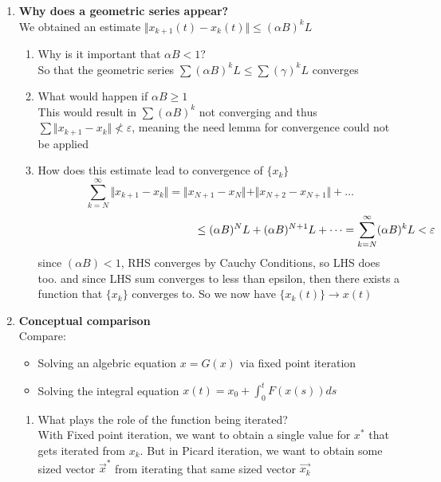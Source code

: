 \documentclass[12pt]{article}
\begin{document}
\begin{enumerate}
    \item[d)] \textbf{Why does a geometric series appear?} \\
    We obtained an estimate $\Vert x_{k+1}(t) - x_k(t) \Vert \leq (\alpha B)^k L$
    \begin{enumerate}
        \item Why is it important that $\alpha B < 1$? \\
        So that the geometric series $\sum (\alpha B)^k L \leq \sum (\gamma)^k L$ converges

        \item What would happen if $\alpha B \geq 1$ \\
        This would result in $\sum (\alpha B)^k$ not converging and thus $\sum \Vert x_{k+1} - x_k \Vert \nless \varepsilon$, meaning the need lemma for convergence could not be applied
        \vspace{4cm}
        \item How does this estimate lead to convergence of $\{x_k\}$ 
        \[\sum_{k=N}^{\infty} \Vert x_{k+1} - x_k \Vert = \Vert x_{N+1} - x_N \Vert + \Vert x_{N+2} - x_{N+1} \Vert + \dots \] 
        \[\hspace*{5cm} \le (\alpha B)^N L + (\alpha B)^{N+1} L + \dots = \sum_{k=N}^{\infty} (\alpha B)^k L < \varepsilon\] 
        since $(\alpha B) < 1$, RHS converges by Cauchy Conditions, so LHS does too.
        and since LHS sum converges to less than epsilon, then there exists a function that $\{x_k\}$ converges to. So we now have $\{x_k(t)\} \rightarrow x(t)$
    \end{enumerate}

    \item[e)] \textbf{Conceptual comparison} \\
    Compare:
    \begin{itemize}
        \item Solving an algebric equation $x = G(x)$ via fixed point iteration
        \item Solving the integral equation $x(t) = x_0 + \int_{0}^{t} F(x(s))ds$
    \end{itemize}
    \begin{enumerate}
        \item What plays the role of the function being iterated? \\
        With Fixed point iteration, we want to obtain a single value for $x^*$ that 
        gets iterated from $x_k$. But in Picard iteration, we want to obtain some 
        sized vector $\vec{x}^*$ from iterating that same sized vector $\vec{x_k}$


\end{enumerate}
\end{enumerate}
\end{document}
